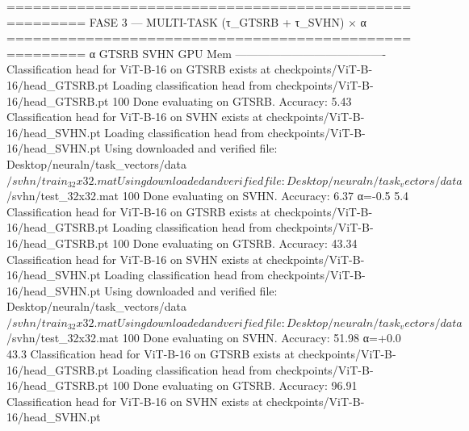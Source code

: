 =======================================================
  FASE 3 — MULTI-TASK (τ_GTSRB + τ_SVHN) × α
=======================================================
  α             GTSRB     SVHN    GPU Mem
  ----------------------------------------
Classification head for ViT-B-16 on GTSRB exists at checkpoints/ViT-B-16/head_GTSRB.pt
Loading classification head from checkpoints/ViT-B-16/head_GTSRB.pt
100%
Done evaluating on GTSRB. Accuracy: 5.43%
Classification head for ViT-B-16 on SVHN exists at checkpoints/ViT-B-16/head_SVHN.pt
Loading classification head from checkpoints/ViT-B-16/head_SVHN.pt
Using downloaded and verified file: Desktop/neuraln/task_vectors/data$/svhn/train_32x32.mat
Using downloaded and verified file: Desktop/neuraln/task_vectors/data$/svhn/test_32x32.mat
100%
Done evaluating on SVHN. Accuracy: 6.37%
  α=-0.5         5.4%
Classification head for ViT-B-16 on GTSRB exists at checkpoints/ViT-B-16/head_GTSRB.pt
Loading classification head from checkpoints/ViT-B-16/head_GTSRB.pt
100%
Done evaluating on GTSRB. Accuracy: 43.34%
Classification head for ViT-B-16 on SVHN exists at checkpoints/ViT-B-16/head_SVHN.pt
Loading classification head from checkpoints/ViT-B-16/head_SVHN.pt
Using downloaded and verified file: Desktop/neuraln/task_vectors/data$/svhn/train_32x32.mat
Using downloaded and verified file: Desktop/neuraln/task_vectors/data$/svhn/test_32x32.mat
100%
Done evaluating on SVHN. Accuracy: 51.98%
  α=+0.0        43.3%
Classification head for ViT-B-16 on GTSRB exists at checkpoints/ViT-B-16/head_GTSRB.pt
Loading classification head from checkpoints/ViT-B-16/head_GTSRB.pt
100%
Done evaluating on GTSRB. Accuracy: 96.91%
Classification head for ViT-B-16 on SVHN exists at checkpoints/ViT-B-16/head_SVHN.pt
